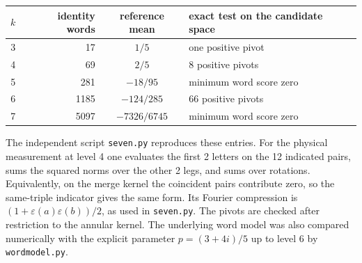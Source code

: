 \documentclass[11pt,a4paper]{amsart}
\begin{document}
\begin{center}
\begin{tabular}{rrcl}
\toprule
$k$ & identity words & reference mean & exact test on the candidate space\\ \midrule
3 & 17 & $1/5$ & one positive pivot\\
4 & 69 & $2/5$ & 8 positive pivots\\
5 & 281 & $-18/95$ & minimum word score zero\\
6 & 1185 & $-124/285$ & 66 positive pivots\\
7 & 5097 & $-7326/6745$ & minimum word score zero\\ \bottomrule
\end{tabular}
\end{center}
The independent script \texttt{seven.py} reproduces these entries. For the physical measurement at level 4 one evaluates the first 2 letters on the 12 indicated pairs, sums the squared norms over the other 2 legs, and sums over rotations. Equivalently, on the merge kernel the coincident pairs contribute zero, so the same-triple indicator gives the same form. Its Fourier compression is $(1+\varepsilon(a)\varepsilon(b))/2$, as used in \texttt{seven.py}. The pivots are checked after restriction to the annular kernel. The underlying word model was also compared numerically with the explicit parameter $p=(3+4i)/5$ up to level 6 by \texttt{wordmodel.py}.
\end{document}
